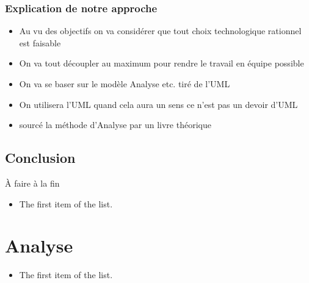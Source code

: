 \documentclass{rapport_stage}
\begin{document}
\section{Explication de notre approche}

\begin{itemize}[label=$\bullet$]
  \item Au vu des objectifs on va considérer que tout choix technologique rationnel est faisable
  \item On va tout découpler au maximum pour rendre le travail en équipe possible
  \item On va se baser sur le modèle Analyse etc. tiré de l'UML
  \item On utilisera l'UML quand cela aura un sens ce n'est pas un devoir d'UML
  \item sourcé la méthode d'Analyse par un livre théorique \cite*{lonchamp_analyse_2015}
\end{itemize}





\chapter*{Conclusion}  %

{ \color{green}
  À faire à la fin
}

\begin{itemize}[label=$\bullet$]
  \item The first item of the list.
\end{itemize}%


\appendix






\part{Analyse}

\begin{itemize}[label=$\bullet$]
  \item The first item of the list.
\end{itemize}

\end{document}
